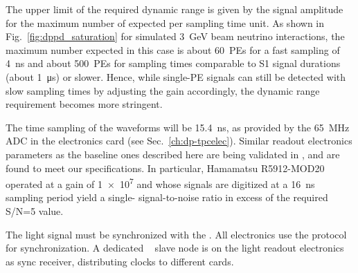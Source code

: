 
The upper limit of the required dynamic range is given by the  signal amplitude for the maximum number of  expected per sampling time unit. As shown in Fig.~\ref{fig:dppd_saturation} for simulated \SI{3}{GeV} beam neutrino interactions, the maximum number expected in this case is about \SI{60}{PEs} for a fast sampling of \SI{4}{ns} and about \SI{500}{PEs} for sampling times comparable to S1 signal durations (about \SI{1}{\micro\second}) or slower. Hence, while single-PE signals can  still be detected with slow sampling times by adjusting the  gain accordingly, the dynamic range requirement becomes more stringent. 

The time sampling of the  waveforms will be \SI{15.4}{ns}, as provided by the \SI{65}{MHz} ADC in the  electronics card (see Sec.~\ref{ch:dp-tpcelec}). Similar readout electronics parameters as the baseline ones described here are being validated in , and are found to meet our specifications. In particular, Hamamatsu R5912-MOD20  operated at a gain of \num{1e7} and whose signals are digitized at a \SI{16}{ns} sampling period yield a single- signal-to-noise ratio in excess of the required S/N=5 value.



The light signal must be synchronized with the . All  electronics use the  protocol for synchronization. A dedicated  ~\cite{utca} slave node is on the light readout  electronics as sync receiver, distributing clocks to different  cards.

